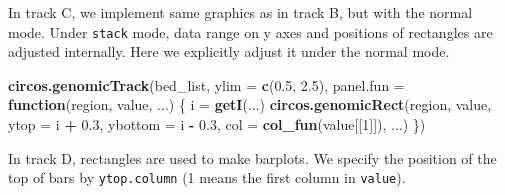 \documentclass[]{book}
\newenvironment{Shaded}{\begin{snugshade}}{\end{snugshade}}
\newcommand{\KeywordTok}[1]{\textcolor[rgb]{0.13,0.29,0.53}{\textbf{#1}}}
\newcommand{\DataTypeTok}[1]{\textcolor[rgb]{0.13,0.29,0.53}{#1}}
\newcommand{\DecValTok}[1]{\textcolor[rgb]{0.00,0.00,0.81}{#1}}
\newcommand{\FloatTok}[1]{\textcolor[rgb]{0.00,0.00,0.81}{#1}}
\newcommand{\StringTok}[1]{\textcolor[rgb]{0.31,0.60,0.02}{#1}}
\newcommand{\ControlFlowTok}[1]{\textcolor[rgb]{0.13,0.29,0.53}{\textbf{#1}}}
\newcommand{\OperatorTok}[1]{\textcolor[rgb]{0.81,0.36,0.00}{\textbf{#1}}}
\newcommand{\NormalTok}[1]{#1}
\begin{document}
In track C, we implement same graphics as in track B, but with the
normal mode. Under \texttt{stack} mode, data range on y axes and
positions of rectangles are adjusted internally. Here we explicitly
adjust it under the normal mode.

\begin{Shaded}
\begin{Highlighting}[]
\KeywordTok{circos.genomicTrack}\NormalTok{(bed_list, }\DataTypeTok{ylim =} \KeywordTok{c}\NormalTok{(}\FloatTok{0.5}\NormalTok{, }\FloatTok{2.5}\NormalTok{), }
    \DataTypeTok{panel.fun =} \ControlFlowTok{function}\NormalTok{(region, value, ...) \{}
\NormalTok{        i =}\StringTok{ }\KeywordTok{getI}\NormalTok{(...)}
        \KeywordTok{circos.genomicRect}\NormalTok{(region, value, }\DataTypeTok{ytop =}\NormalTok{ i }\OperatorTok{+}\StringTok{ }\FloatTok{0.3}\NormalTok{, }\DataTypeTok{ybottom =}\NormalTok{ i }\OperatorTok{-}\StringTok{ }\FloatTok{0.3}\NormalTok{, }
            \DataTypeTok{col =} \KeywordTok{col_fun}\NormalTok{(value[[}\DecValTok{1}\NormalTok{]]), ...)}
\NormalTok{\})}
\end{Highlighting}
\end{Shaded}

In track D, rectangles are used to make barplots. We specify the
position of the top of bars by \texttt{ytop.column} (1 means the first
column in \texttt{value}).

\begin{Shaded}
\end{Shaded}
\end{document}
